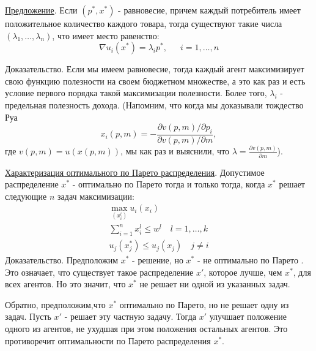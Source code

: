 \underline{Предложение}. Если $(p^*,x^*)$ - равновесие, причем каждый потребитель имеет
положительное количество каждого товара, тогда существуют такие числа
$(\lambda_1,\ldots,\lambda_n)$, что имеет место равенство:
$$
\nabla u_i(x^*)=\lambda_ip^*,\,\,\,\quad i=1,\ldots,n
$$

Доказательство. Если мы имеем равновесие, тогда каждый агент
максимизирует свою функцию полезности на своем бюджетном  множестве,
а это как раз и есть условие
первого порядка такой максимизации полезности. Более того,
$\lambda_i$ - предельная полезность дохода. (Напомним, что когда мы доказывали
тождество Руа
$$
x_i(p,m)=-{\frac{\partial v(p,m)/\partial p_i}{\partial v(p,m)/\partial m}},
$$
где $v(p,m)=u(x(p,m))$, мы как раз и выяснили, что $\lambda={\frac{\partial v(p,m)}{\partial m}}$).

\underline{Характеризация оптимального по Парето  распределения}.
Допустимое распределение $x^*$ - оптимально по Парето  тогда и
только тогда, когда $x^*$ решает следующие $n$ задач максимизации:
$$
\begin{array}{c}
\max_{(x^l_i)}u_i(x_i)\\
\sum^n_{i=1}x^l_i\le w^l\quad l=1,\ldots,k\\
u_j(x^*_j)\le u_j(x_j)\quad j\ne i
\end{array}
$$
Доказательство. Предположим $x^*$ - решение, но $x^*$ -  не
оптимально по Парето . Это означает, что существует такое распределение $x'$,
которое лучше, чем $x^*$, для всех агентов. Но это значит, что
$x^*$ не решает ни одной из указанных задач.

Обратно, предположим,что $x^*$ оптимально по Парето, но
не решает одну из задач. Пусть $x'$ - решает эту частную задачу.
Тогда $x'$ улучшает положение одного из агентов, не ухудшая при этом
положения остальных агентов. Это противоречит оптимальности по Парето распределения $x^*$.

